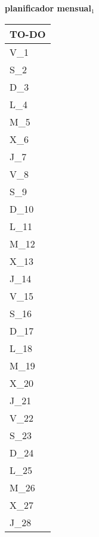 \clearpage
{\raggedright
	\fontsize{25}{50}\selectfont
	\textbf{\NextYear}
}\scriptsize{\textbf{planificador mensual$_1$}}\\[11.3pt]



	\noindent\dotfill
	\renewcommand{\arraystretch}{1.5}\scriptsize
		\begin{longtabu} to \textwidth { X[l]}
		\centering \small{\textbf{TO-DO}} \\
		\toprule
		V_{1} \dotfill\\
		S_{2} \dotfill\\
		D_{3} \dotfill\\
		\hline
		L_{4} \dotfill\\
		M_{5} \dotfill\\
		X_{6} \dotfill\\
		J_{7} \dotfill\\
		V_{8} \dotfill\\
		S_{9} \dotfill\\
		D_{10} \dotfill\\
		\hline
		L_{11} \dotfill\\
		M_{12} \dotfill\\
		X_{13} \dotfill\\
		J_{14} \dotfill\\
		V_{15} \dotfill\\
		S_{16} \dotfill\\
		D_{17} \dotfill\\
		\hline
		L_{18} \dotfill\\
		M_{19} \dotfill\\
		X_{20} \dotfill\\
		J_{21} \dotfill\\
		V_{22} \dotfill\\
		S_{23} \dotfill\\
		D_{24} \dotfill\\
		\hline
		L_{25} \dotfill\\
		M_{26} \dotfill\\
		X_{27} \dotfill\\
		J_{28} \dotfill\\

		\bottomrule

	\end{longtabu}


\clearpage
